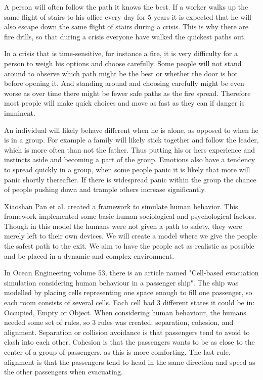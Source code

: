 A person will often follow the path it knows the best. If a worker walks up the same flight of stairs to his office  
every day for 5 years it is expected that he will also escape down the same flight of stairs during a crisis. This  
is why there are fire drills, so that during a crisis everyone have walked the quickest paths out. 
 
In a crisis that is time-sensitive, for instance a fire, it is very difficulty for a person to weigh his options and  
choose carefully. Some people will not stand around to observe which path might be the best or whether the  
door is hot before opening it. And standing around and choosing carefully might be even worse as  
over time there might be fewer safe paths as the fire spread. Therefore most people will make quick choices 
and move as fast as they can if danger is imminent. 
 
An individual will likely behave different when he is alone, as opposed to when he is in a group. For example  
a family will likely stick together and follow the leader, which is more often than not the father. Thus putting  
his or hers experience and instincts aside and becoming a part of the group. Emotions also have a tendency  
to spread quickly in a group, when some people panic it is likely that more will panic shortly thereafter. If  
there is widespread panic within the group the chance of people pushing down and trample others increase  
significantly. 
 
Xiaoshan Pan et al.\cite{Pan:2007} created a framework to simulate human behavior. This framework implemented some 
basic human sociological and psychological factors. Though in this model the humans were not given a path 
to safety, they were merely left to their own devices. We will create a model where we give the people the 
safest path to the exit. We aim to have the people act as realistic as possible and be placed in a dynamic 
and complex environment.

In Ocean Engineering volume 53, there is an article named "Cell-based evacuation simulation considering human behaviour in a passenger ship"\cite{celleva}. 
The ship was modelled by placing cells representing one space enough to fill one passenger, so each room consists of several cells. 
Each cell had 3 different states it could be in: Occupied, Empty or Object. When considering human behaviour, the humans needed some set of rules, so 3 rules was created: separation, cohesion, and alignment. 
Separation or collision avoidance is that passengers tend to avoid to clash into each other. Cohesion is that the passengers wants to be as close to the center of a group of passengers, as this is more comforting. The last rule, alignment is that the passengers tend to head in the same direction and speed as the other passengers when evacuating.
 
